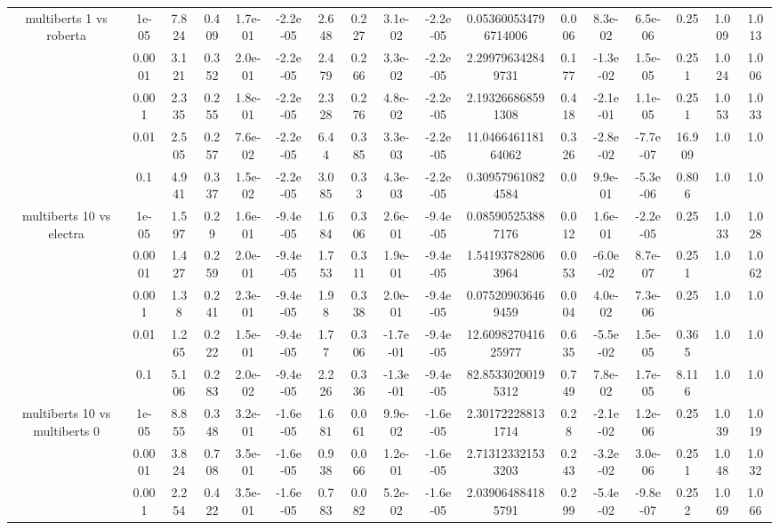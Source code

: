 \begin{tabular}{|c|c|c|c|c|c|c|c|c|c|c|c|c|c|c|c|c|}
\hline
\multirow{5}{*}{multiberts 1 vs roberta } & 1e-05 & 7.824 & 0.409 & 1.7e-01 & -2.2e-05 & 2.648 & 0.227 & 3.1e-02 & -2.2e-05 & 0.053600534796714006 & 0.006 & 8.3e-02 & 6.5e-06 & 0.25 & 1.009 & 1.013 \\
 & 0.0001 & 3.121 & 0.352 & 2.0e-01 & -2.2e-05 & 2.479 & 0.266 & 3.3e-02 & -2.2e-05 & 2.299796342849731 & 0.177 & -1.3e-02 & 1.5e-05 & 0.251 & 1.024 & 1.006 \\
 & 0.001 & 2.335 & 0.255 & 1.8e-01 & -2.2e-05 & 2.328 & 0.276 & 4.8e-02 & -2.2e-05 & 2.193266868591308 & 0.418 & -2.1e-01 & 1.1e-05 & 0.251 & 1.053 & 1.033 \\
 & 0.01 & 2.505 & 0.257 & 7.6e-02 & -2.2e-05 & 6.44 & 0.385 & 3.3e-03 & -2.2e-05 & 11.046646118164062 & 0.326 & -2.8e-02 & -7.7e-07 & 16.909 & 1.0 & 1.0 \\
 & 0.1 & 4.941 & 0.337 & 1.5e-02 & -2.2e-05 & 3.085 & 0.33 & 4.3e-03 & -2.2e-05 & 0.309579610824584 & 0.0 & 9.9e-01 & -5.3e-06 & 0.806 & 1.0 & 1.0 \\
\hline
\multirow{5}{*}{multiberts 10 vs electra } & 1e-05 & 1.597 & 0.29 & 1.6e-01 & -9.4e-05 & 1.684 & 0.306 & 2.6e-01 & -9.4e-05 & 0.085905253887176 & 0.012 & 1.6e-01 & -2.2e-05 & 0.25 & 1.033 & 1.028 \\
 & 0.0001 & 1.427 & 0.259 & 2.0e-01 & -9.4e-05 & 1.753 & 0.311 & 1.9e-01 & -9.4e-05 & 1.541937828063964 & 0.053 & -6.0e-02 & 8.7e-07 & 0.251 & 1.0 & 1.062 \\
 & 0.001 & 1.38 & 0.241 & 2.3e-01 & -9.4e-05 & 1.98 & 0.338 & 2.0e-01 & -9.4e-05 & 0.075209036469459 & 0.004 & 4.0e-02 & 7.3e-06 & 0.25 & 1.0 & 1.0 \\
 & 0.01 & 1.265 & 0.222 & 1.5e-01 & -9.4e-05 & 1.77 & 0.306 & -1.7e-01 & -9.4e-05 & 12.609827041625977 & 0.635 & -5.5e-02 & 1.5e-05 & 0.365 & 1.0 & 1.0 \\
 & 0.1 & 5.106 & 0.283 & 2.0e-02 & -9.4e-05 & 2.226 & 0.336 & -1.3e-01 & -9.4e-05 & 82.85330200195312 & 0.749 & 7.8e-02 & 1.7e-05 & 8.116 & 1.0 & 1.0 \\
\hline
\multirow{5}{*}{multiberts 10 vs multiberts 0} & 1e-05 & 8.855 & 0.348 & 3.2e-01 & -1.6e-05 & 1.681 & 0.061 & 9.9e-02 & -1.6e-05 & 2.301722288131714 & 0.28 & -2.1e-02 & 1.2e-06 & 0.25 & 1.039 & 1.019 \\
 & 0.0001 & 3.824 & 0.708 & 3.5e-01 & -1.6e-05 & 0.938 & 0.066 & 1.2e-01 & -1.6e-05 & 2.713123321533203 & 0.243 & -3.2e-02 & 3.0e-06 & 0.251 & 1.048 & 1.032 \\
 & 0.001 & 2.254 & 0.422 & 3.5e-01 & -1.6e-05 & 0.783 & 0.082 & 5.2e-02 & -1.6e-05 & 2.039064884185791 & 0.299 & -5.4e-02 & -9.8e-07 & 0.252 & 1.069 & 1.066 \\

\end{tabular}
